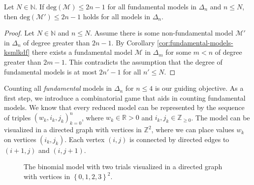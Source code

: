 \begin{proposition}\label{prop:degree-fundamental-models-reduced}
    Let \(N \in \mathbb{N} \). If \( \mathrm{deg}(\mathcal{M}) \leq 2n - 1\) for all fundamental models in $\Delta_n$ and $n \leq N$, then $\mathrm{deg}(\mathcal{M'}) \leq 2n - 1$ holds for all models in $\Delta_n$.
\end{proposition}

\begin{proof}
    Let $N \in \mathbb{N}$ and $n \leq N$.
    Assume there is some non-fundamental model $\mathcal{M}'$ in $\Delta_n$ of degree greater than $2n - 1$. By Corollary \ref{cor:fundamental-models-ksmlkdf} there exists a fundamental model $\mathcal{M}$ in $\Delta_m$ for some $m < n$ of degree greater than $2m - 1$. This contradicts the assumption that the degree of fundamental models is at most $2n' - 1$ for all $n' \leq N$.
\end{proof}

Counting all \emph{fundamental} models in $\Delta_n$ for $n \leq 4$ is our guiding objective. As a first step, we introduce a combinatorial game that aids in counting fundamental models. We know that every reduced model can be represented by the sequence of triples $(w_k, i_k, j_k)^{n}_{k=0}$, where $w_k \in \mathbb{R}{>0}$ and $i_k, j_k \in \mathbb{Z}_{\geq 0}$. The model can be visualized in a directed graph with vertices in $\mathbb{Z}^2$, where we can place values $w_k$ on vertices $(i_k, j_k)$. Each vertex $(i,j)$ is connected by directed edges to $(i+1, j)$ and $(i, j+1)$. 

\begin{figure}\label{fig:binom-discrete-model-visual}
    \centering
    \caption{The binomial model with two trials visualized in a directed graph with vertices in $\left\{0,1,2,3 \right\}^2$.}
\end{figure}


